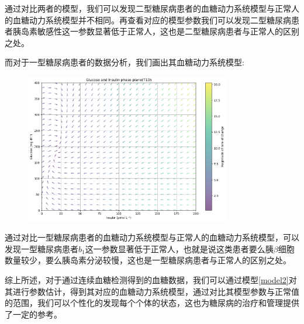 通过对比两者的模型，我们可以发现二型糖尿病患者的血糖动力系统模型与正常人的血糖动力系统模型并不相同。再查看对应的模型参数我们可以发现二型糖尿病患者胰岛素敏感性这一参数显著低于正常人，这也是二型糖尿病患者与正常人的区别之处。

而对于一型糖尿病患者的数据分析，我们画出其血糖动力系统模型:
\begin{figure}[H]
    \centering
    \includegraphics[width=0.8\textwidth]{Img/t1dphase.png}
    \label{fig:1type}
\end{figure}

通过对比一型糖尿病患者的血糖动力系统模型与正常人的血糖动力系统模型，可以发现一型糖尿病患者$b_1$这一参数显著低于正常人，也就是说这类患者要么胰$\beta$细胞数量较少，要么胰岛素分泌较慢，这也是一型糖尿病患者与正常人的区别之处。

综上所述，对于通过连续血糖检测得到的血糖数据，我们可以通过模型\ref{model2}对其进行参数估计，得到其对应的血糖动力系统模型，通过对比其模型参数与正常值的范围，我们可以个性化的发现每个个体的状态，这也为糖尿病的治疗和管理提供了一定的参考。

